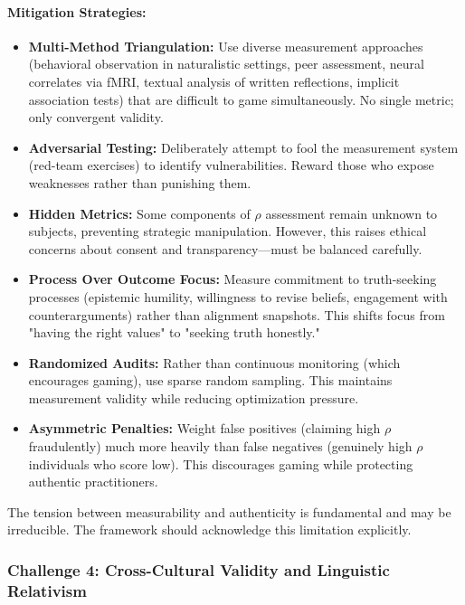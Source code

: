 \documentclass[11pt,a4paper]{article}
\theoremstyle{definition}
\theoremstyle{remark}
\begin{document}
\paragraph{Mitigation Strategies:}
\begin{itemize}
    \item \textbf{Multi-Method Triangulation:} Use diverse measurement approaches (behavioral observation in naturalistic settings, peer assessment, neural correlates via fMRI, textual analysis of written reflections, implicit association tests) that are difficult to game simultaneously. No single metric; only convergent validity.
    
    \item \textbf{Adversarial Testing:} Deliberately attempt to fool the measurement system (red-team exercises) to identify vulnerabilities. Reward those who expose weaknesses rather than punishing them.
    
    \item \textbf{Hidden Metrics:} Some components of \(\rho\) assessment remain unknown to subjects, preventing strategic manipulation. However, this raises ethical concerns about consent and transparency—must be balanced carefully.
    
    \item \textbf{Process Over Outcome Focus:} Measure commitment to truth-seeking processes (epistemic humility, willingness to revise beliefs, engagement with counterarguments) rather than alignment snapshots. This shifts focus from "having the right values" to "seeking truth honestly."
    
    \item \textbf{Randomized Audits:} Rather than continuous monitoring (which encourages gaming), use sparse random sampling. This maintains measurement validity while reducing optimization pressure.
    
    \item \textbf{Asymmetric Penalties:} Weight false positives (claiming high \(\rho\) fraudulently) much more heavily than false negatives (genuinely high \(\rho\) individuals who score low). This discourages gaming while protecting authentic practitioners.
\end{itemize}

The tension between measurability and authenticity is fundamental and may be irreducible. The framework should acknowledge this limitation explicitly.

\subsubsection{Challenge 4: Cross-Cultural Validity and Linguistic Relativism}
\end{document}

